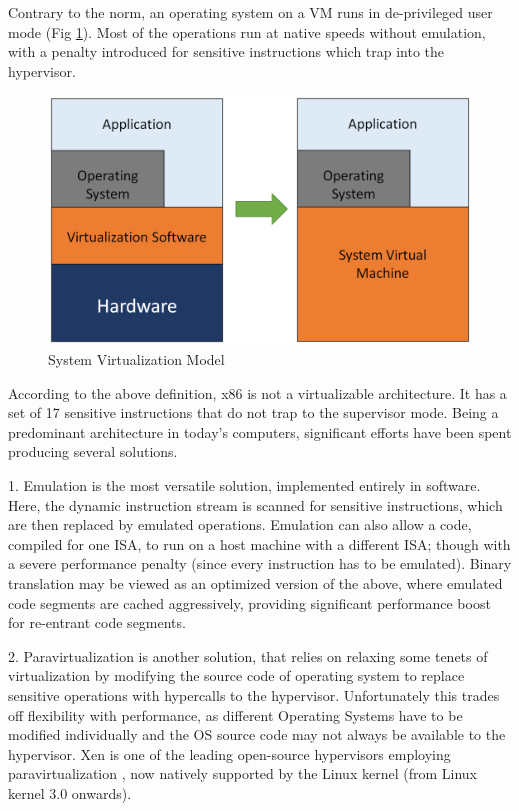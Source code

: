 Contrary to the norm, an operating system on a VM runs in de-privileged user mode (Fig \ref{fig:sys_virt}). Most of the operations run at native speeds without emulation, with a penalty introduced for sensitive instructions which trap into the hypervisor.

\setlength{\belowcaptionskip}{-10pt}

\begin{figure}[H]
  \centering
  \includegraphics[scale=0.6]{figures/sys_virt.png}
  \caption{System Virtualization Model}
  \label{fig:sys_virt}
\end{figure}

According to the above definition, x86 is not a virtualizable architecture. It has a set of 17 sensitive instructions that do not trap to the supervisor mode. Being a predominant architecture in today’s computers, significant efforts have been spent producing several solutions.

1. Emulation is the most versatile solution, implemented entirely in software. Here, the dynamic instruction stream is scanned for sensitive instructions, which are then replaced by emulated operations. Emulation can also allow a code, compiled for one ISA, to run on a host machine with a different ISA; though with a severe performance penalty (since every instruction has to be emulated). Binary translation may be viewed as an optimized version of the above, where emulated code segments are cached aggressively, providing significant performance boost for re-entrant code segments.

2. Paravirtualization is another solution, that relies on relaxing some tenets of virtualization by modifying the source code of operating system to replace sensitive operations with hypercalls to the hypervisor. Unfortunately this trades off flexibility with performance, as different Operating Systems have to be modified individually and the OS source code may not always be available to the hypervisor. Xen is one of the leading open-source hypervisors employing paravirtualization \cite{xen_virt}, now natively supported by the Linux kernel (from Linux kernel 3.0 onwards).

